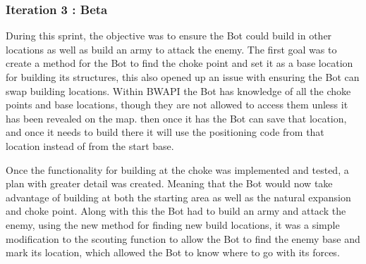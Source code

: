 \documentclass[journal]{IEEEtran}
\begin{document}
	\subsubsection{Iteration 3 : Beta}
	During this sprint, the objective was to ensure the Bot could build in other locations as well as build an army to attack the enemy. The first goal was to create a method for the Bot to find the choke point and set it as a base location for building its structures, this also opened up an issue with ensuring the Bot can swap building locations. Within BWAPI the Bot has knowledge of all the choke points and base locations, though they are not allowed to access them unless it has been revealed on the map. then once it has the Bot can save that location, and once it needs to build there it will use the positioning code from that location instead of from the start base. 
	
	Once the functionality for building at the choke was implemented and tested, a plan with greater detail was created. Meaning that the Bot would now take advantage of building at both the starting area as well as the natural expansion and choke point. Along with this the Bot had to build an army and attack the enemy, using the new method for finding new build locations, it was a simple modification to the scouting function to allow the Bot to find the enemy base and mark its location, which allowed the Bot to know where to go with its forces.
	\newline
	
\end{document}
